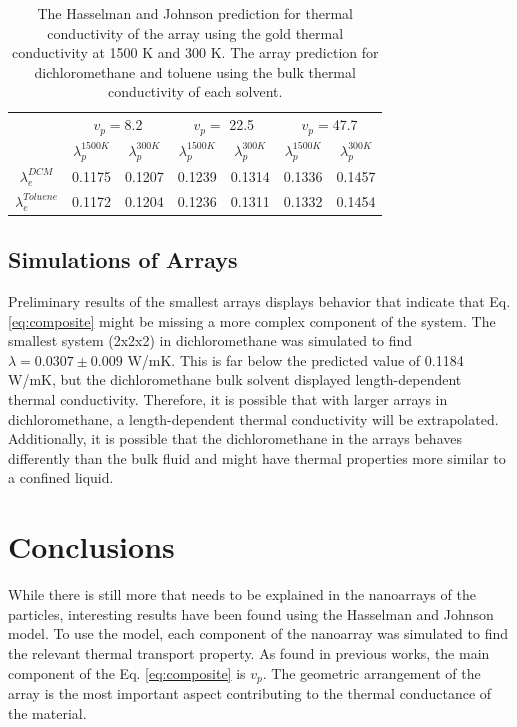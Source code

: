 \begin{table}
    \centering
    \begin{tabular}{c|cc|cc|cc}
    \toprule
        &\multicolumn{2}{c}{$v_p=$8.2} & \multicolumn{2}{c}{$v_p=$ 22.5} & \multicolumn{2}{c}{$v_p=$47.7}\\
        \vspace{5pt}
         &$\lambda_p^{1500 K}$ & $\lambda_p^{300 K}$ &$\lambda_p^{1500 K}$ & $\lambda_p^{300 K}$ &$\lambda_p^{1500 K}$ & $\lambda_p^{300 K}$  \\
         \hline
         $\lambda_e^{DCM}$& 0.1175& 0.1207& 0.1239& 0.1314& 0.1336& 0.1457\\
         $\lambda_e^{Toluene}$ & 0.1172 & 0.1204& 0.1236& 0.1311& 0.1332& 0.1454\\
         \bottomrule
    \end{tabular}
    \caption{The Hasselman and Johnson prediction for thermal conductivity of the  array using the gold thermal conductivity at 1500 K and 300 K. The array prediction for dichloromethane and toluene using the bulk thermal conductivity of each solvent.}
    \label{tab:predition}
\end{table}

\subsection{Simulations of Arrays}
Preliminary results of the smallest arrays displays behavior that indicate that Eq. \ref{eq:composite} might be missing a more complex component of the system.
The smallest system (2x2x2) in dichloromethane was simulated to find $\lambda = 0.0307 \pm 0.009$ W/mK. 
This is far below the predicted value of 0.1184 W/mK, but the dichloromethane bulk solvent displayed length-dependent thermal conductivity.
Therefore, it is possible that with larger arrays in dichloromethane, a length-dependent thermal conductivity will be extrapolated. 
Additionally, it is possible that the dichloromethane in the arrays behaves differently than the bulk fluid and might have thermal properties more similar to a confined liquid.

\section{Conclusions}
While there is still more that needs to be explained in the nanoarrays of the  particles, interesting results have been found using the Hasselman and Johnson model. 
To use the model, each component of the nanoarray was simulated to find the relevant thermal transport property. 
As found in previous works, the main component of the Eq. \ref{eq:composite} is $v_p$. 
The geometric arrangement of the array is the most important aspect contributing to the thermal conductance of the material.

